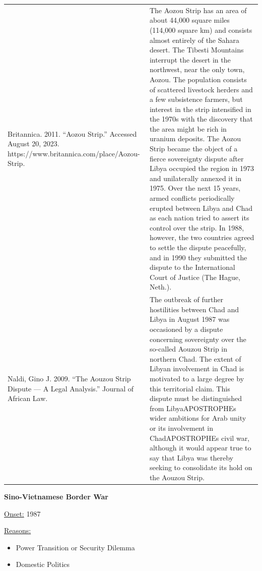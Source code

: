 {\begin{longtable}{p{}p{}}
Britannica. 2011. “Aozou Strip.” Accessed August 20, 2023. https://www.britannica.com/place/Aozou-Strip. & The Aozou Strip has an area of about 44,000 square miles (114,000 square km) and consists almost entirely of the Sahara desert. The Tibesti Mountains interrupt the desert in the northwest, near the only town, Aozou. The population consists of scattered livestock herders and a few subsistence farmers, but interest in the strip intensified in the 1970s with the discovery that the area might be rich in uranium deposits. The Aozou Strip became the object of a fierce sovereignty dispute after Libya occupied the region in 1973 and unilaterally annexed it in 1975. Over the next 15 years, armed conflicts periodically erupted between Libya and Chad as each nation tried to assert its control over the strip. In 1988, however, the two countries agreed to settle the dispute peacefully, and in 1990 they submitted the dispute to the International Court of Justice (The Hague, Neth.).
\\
Naldi, Gino J. 2009. “The Aouzou Strip Dispute — A Legal Analysis.” Journal of African Law. & The outbreak of further hostilities between Chad and Libya in August 1987 was occasioned by a dispute concerning sovereignty over the so-called Aouzou Strip in northern Chad. The extent of Libyan involvement in Chad is motivated to a large degree by this territorial claim. This dispute must be distinguished from LibyaAPOSTROPHEs wider ambitions for Arab unity or its involvement in ChadAPOSTROPHEs civil war, although it would appear true to say that Libya was thereby seeking to consolidate its hold on the Aouzou Strip.
\\
\end{longtable}}
\clearpage
         \textbf{Sino-Vietnamese Border War} 

          \underline{Onset:} 1987         

\underline{Reasons:}
\begin{itemize}
\item Power Transition or Security Dilemma
\item Domestic Politics
\end{itemize}

